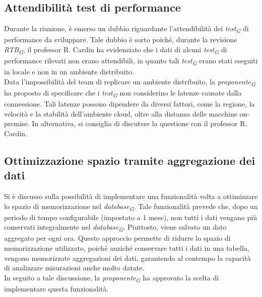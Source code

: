 \documentclass{article}
\begin{document}
    \subsection{Attendibilità test di performance}
        Durante la riunione, è emerso un dubbio riguardante l'attendibilità dei \textit{test}\textsubscript{\textit{G}} di performance da sviluppare. Tale dubbio è sorto poiché, durante la revisione \textit{RTB}\textsubscript{\textit{G}}, il professor R. Cardin ha evidenziato che i dati di alcuni \textit{test}\textsubscript{\textit{G}} di performance rilevati non erano attendibili, in quanto tali \textit{test}\textsubscript{\textit{G}} erano stati eseguiti in locale e non in un ambiente distribuito. \\
        Data l'impossibilità del team di replicare un ambiente distribuito, la \textit{proponente}\textsubscript{\textit{G}} ha proposto di specificare che i \textit{test}\textsubscript{\textit{G}} non considerino le latenze causate dalla connessione. Tali latenze possono dipendere da diversi fattori, come la regione, la velocità e la stabilità dell'ambiente cloud, oltre alla distanza delle macchine on-premise. In alternativa, si consiglia di discutere la questione con il professor R. Cardin.

    \subsection{Ottimizzazione spazio tramite aggregazione dei dati}
        Si è discusso sulla possibilità di implementare una funzionalità volta a ottimizzare lo spazio di memorizzazione nel \textit{database}\textsubscript{\textit{G}}. Tale funzionalità prevede che, dopo un periodo di tempo configurabile (impostato a 1 mese), non tutti i dati vengano più conservati integralmente nel \textit{database}\textsubscript{\textit{G}}. Piuttosto, viene salvato un dato aggregato per ogni ora. Questo approccio permette di ridurre lo spazio di memorizzazione utilizzato, poiché anziché conservare tutti i dati in una tabella, vengono memorizzate aggregazioni dei dati, garantendo al contempo la capacità di analizzare misurazioni anche molto datate. \\
        In seguito a tale discussione, la \textit{proponente}\textsubscript{\textit{G}} ha approvato la scelta di implementare questa funzionalità.
\end{document}
